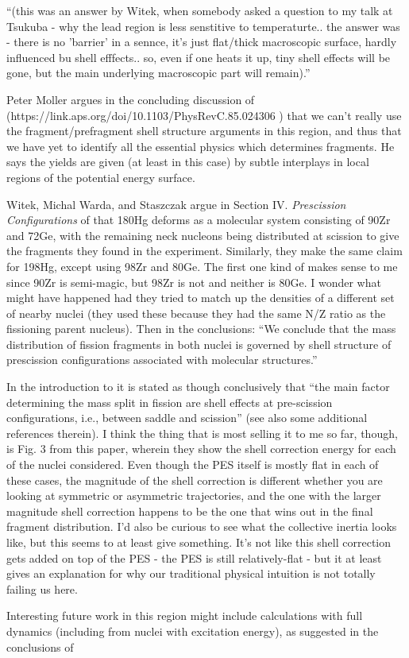 ``(this was an answer by Witek, when somebody asked a question to my talk at Tsukuba - why the lead region is less senstitive to temperaturte.. the answer was - there is no 'barrier' in a sennce, it's just flat/thick macroscopic surface, hardly influenced bu shell efffects.. so, even if one heats it up, tiny shell effects will be gone, but the main underlying macroscopic part will remain).''

Peter Moller argues in the concluding discussion of (https://link.aps.org/doi/10.1103/PhysRevC.85.024306 \cite{Moller2012}) that we can't really use the fragment/prefragment shell structure arguments in this region, and thus that we have yet to identify all the essential physics which determines fragments. He says the yields are given (at least in this case) by subtle interplays in local regions of the potential energy surface.

Witek, Michal Warda, and Staszczak argue in Section IV. \textit{Prescission Configurations} of \cite{Warda2012a} that 180Hg deforms as a molecular system consisting of 90Zr and 72Ge, with the remaining neck nucleons being distributed at scission to give the fragments they found in the experiment. Similarly, they make the same claim for 198Hg, except using 98Zr and 80Ge. The first one kind of makes sense to me since 90Zr is semi-magic, but 98Zr is not and neither is 80Ge. I wonder what might have happened had they tried to match up the densities of a different set of nearby nuclei (they used these because they had the same N/Z ratio as the fissioning parent nucleus). Then in the conclusions: ``We conclude that the mass distribution of fission fragments in both nuclei is governed by shell structure of prescission configurations associated with molecular structures.''

In the introduction to \cite{Mcdonnell2014} it is stated as though conclusively that ``the main factor determining the mass split in fission are shell effects at pre-scission configurations, i.e., between saddle and scission'' (see also some additional references therein). I think the thing that is most selling it to me so far, though, is Fig. 3 from this paper, wherein they show the shell correction energy for each of the nuclei considered. Even though the PES itself is mostly flat in each of these cases, the magnitude of the shell correction is different whether you are looking at symmetric or asymmetric trajectories, and the one with the larger magnitude shell correction happens to be the one that wins out in the final fragment distribution. I'd also be curious to see what the collective inertia looks like, but this seems to at least give something. It's not like this shell correction gets added on top of the PES - the PES is still relatively-flat - but it at least gives an explanation for why our traditional physical intuition is not totally failing us here.

Interesting future work in this region might include calculations with full dynamics (including from nuclei with excitation energy), as suggested in the conclusions of \cite{Mcdonnell2014}






